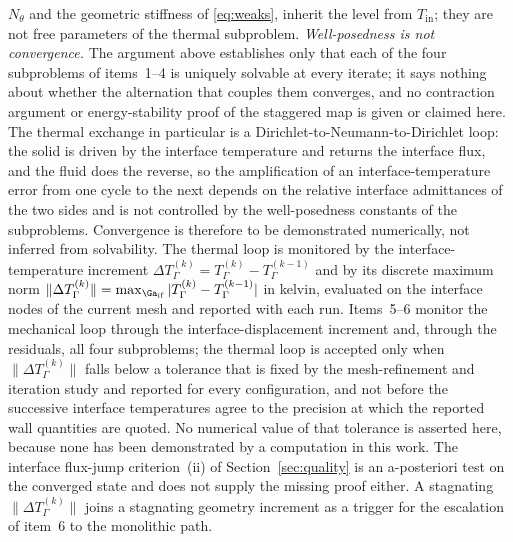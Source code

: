 $N_\theta$ and the geometric stiffness of \eqref{eq:weaks}, inherit the level from
$T_{\mathrm{in}}$; they are not free parameters of the thermal subproblem.
\emph{Well-posedness is not convergence.} The argument above establishes only that each of the four
subproblems of items~1--4 is uniquely solvable at every iterate; it says nothing about whether the
alternation that couples them converges, and no contraction argument or energy-stability proof of
the staggered map is given or claimed here. The thermal exchange in particular is a
Dirichlet-to-Neumann-to-Dirichlet loop: the solid is driven by the interface temperature and returns
the interface flux, and the fluid does the reverse, so the amplification of an interface-temperature
error from one cycle to the next depends on the relative interface admittances of the two sides and
is not controlled by the well-posedness constants of the subproblems. Convergence is therefore to be
demonstrated numerically, not inferred from solvability. The thermal loop is monitored by the
interface-temperature increment $\Delta T_\Gamma^{(k)}=T_\Gamma^{(k)}-T_\Gamma^{(k-1)}$ and by its
discrete maximum norm
$\|\Delta T_\Gamma^{(k)}\|=\max_{\Ga_{\mathrm{if}}}|T_\Gamma^{(k)}-T_\Gamma^{(k-1)}|$ in kelvin,
evaluated on the interface nodes of the current mesh and reported with each run. Items~5--6 monitor
the mechanical loop through the interface-displacement increment and, through the residuals, all
four subproblems; the thermal loop
is accepted only when $\|\Delta T_\Gamma^{(k)}\|$ falls below a tolerance that is fixed by the
mesh-refinement and iteration study and reported for every configuration, and not before the
successive interface temperatures agree to the precision at which the reported wall quantities are
quoted. No numerical value of that tolerance is asserted here, because none has been demonstrated by
a computation in this work. The interface flux-jump criterion~(ii) of
Section~\ref{sec:quality} is an a-posteriori test on the converged state and does not supply the
missing proof either. A stagnating $\|\Delta T_\Gamma^{(k)}\|$ joins a stagnating geometry increment
as a trigger for the escalation of item~6 to the monolithic path.

